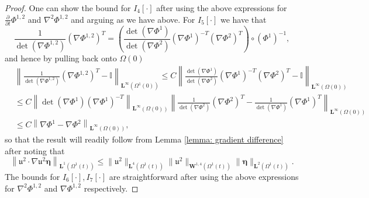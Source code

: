 \documentclass[a4paper]{amsart}
\numberwithin{equation}{section}
\newcommand{\ddt}[1]{\frac{\partial #1}{\partial t}}
\newcommand{\grad}{\nabla}
\theoremstyle{plain}
\newcommand{\mbf}[1]{\mathbf{#1}}
\newcommand{\mbb}[1]{\mathbb{#1}}
\newcommand{\utwo}{\boldsymbol{\mathfrak{u}}^2}
\begin{document}
\begin{proof}
        One can show the bound for $I_4[\cdot]$ after using the above expressions for $\ddt{} \Phi^{1,2}$ and $\grad^2 \Phi^{1,2}$ and arguing as we have above.
        For $I_5[\cdot]$ we have that
        \[ \frac{1}{\det(\grad \Phi^{1,2})} (\grad \Phi^{1,2})^T = \left(\frac{\det(\grad \Phi^1)}{\det(\grad \Phi^2)}(\grad \Phi^1)^{-T} (\grad \Phi^2)^T\right) \circ (\Phi^1)^{-1}, \]
        and hence by pulling back onto $\Omega(0)$
        \begin{align*}
        &\left\|\frac{1}{\det(\grad \Phi^{1,2})} (\grad \Phi^{1,2} )^T - \mbb{I}\right\|_{\mbf{L}^\infty(\Omega^1(0))} \leq C \left\| \frac{\det(\grad \Phi^1)}{\det(\grad \Phi^2)}(\grad \Phi^1)^{-T} (\grad \Phi^2)^T - \mbb{I} \right\|_{\mbf{L}^\infty(\Omega(0))}\\
        &\leq  C\left\| \det(\grad \Phi^1)(\grad \Phi^1)^{-T}\right\|_{\mbf{L}^\infty(\Omega(0))} \left\| \frac{1}{\det(\grad \Phi^2)} (\grad \Phi^2)^T - \frac{1}{\det(\grad \Phi^1)} (\grad \Phi^1)^T \right\|_{\mbf{L}^\infty(\Omega(0))}\\
        &\leq C\left\| \grad \Phi^1 - \grad \Phi^2 \right\|_{\mbf{L}^\infty(\Omega(0))},
        \end{align*}
        so that the result will readily follow from Lemma \ref{lemma: gradient difference} after noting that
        \[\left\|\utwo \cdot \grad \utwo \boldsymbol{\eta}\right\|_{\mbf{L}^1(\Omega^1(t))} \leq \|\utwo\|_{\mbf{L}^4(\Omega^1(t))} \|\utwo\|_{\mbf{W}^{1,4}(\Omega^1(t))}\|\boldsymbol{\eta}\|_{\mbf{L}^2(\Omega^1(t))}. \]
        The bounds for $I_6[\cdot], I_7[\cdot]$ are straightforward after using the above expressions for $\grad^2 \Phi^{1,2}$ and $\grad \Phi^{1,2}$ respectively.


\end{proof}
\end{document}

